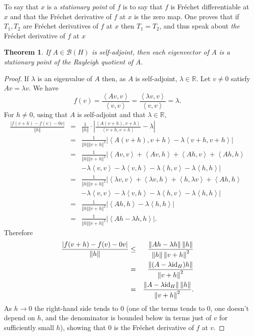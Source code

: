 \documentclass{article}
\newcommand{\inner}[2]{\left\langle #1, #2 \right\rangle}
\newcommand{\id}{\ensuremath\mathrm{id}}
\newcommand{\norm}[1]{\left\Vert #1 \right\Vert}
\newtheorem{theorem}{Theorem}
\theoremstyle{definition}
\begin{document}
To say that $x$ is a {\em stationary point} of $f$ is to say that
$f$ is Fr\'echet differentiable at $x$ and that the Fr\'echet derivative of $f$ at $x$ is the zero map. One proves that
if $T_1,T_2$ are Fr\'echet derivatives of $f$ at $x$ then $T_1=T_2$, and thus speak about {\em the} Fr\'echet derivative
of $f$ at $x$

\begin{theorem}
If $A \in \mathscr{B}(H)$ is self-adjoint, then each eigenvector of $A$ is a stationary point
of the Rayleigh quotient of $A$.
\end{theorem}
\begin{proof}
If $\lambda$ is an eigenvalue of $A$ then, as $A$ is self-adjoint, $\lambda \in \mathbb{R}$. Let $v \neq 0$ satisfy
$Av=\lambda v$. We have
\[
f(v)=\frac{\inner{Av}{v}}{\inner{v}{v}}= \frac{\inner{\lambda v}{v}}{\inner{v}{v}}=\lambda.
\]
For $h \neq 0$, using that $A$ is self-adjoint and that $\lambda \in \mathbb{R}$,
\begin{eqnarray*}
\frac{|f(v+h)-f(v)-0v|}{\norm{h}}&=&\frac{1}{\norm{h}} \cdot \left| \frac{\inner{A(v+h)}{v+h}}{\inner{v+h}{v+h}} - \lambda \right|\\
&=&\frac{1}{\norm{h} \norm{v+h}^2} \left| \inner{A(v+h)}{v+h} - \lambda \inner{v+h}{v+h} \right|\\
&=&\frac{1}{\norm{h} \norm{v+h}^2} \big| \inner{Av}{v}+\inner{Av}{h}+\inner{Ah}{v}+\inner{Ah}{h}\\
&&-\lambda \inner{v}{v} - \lambda \inner{v}{h}-\lambda \inner{h}{v} - \lambda \inner{h}{h}  \big|\\
&=&\frac{1}{\norm{h} \norm{v+h}^2} \big| \inner{\lambda v}{v}+\inner{\lambda v}{h}+\inner{ h}{\lambda v}+\inner{A h}{h}\\
&&-\lambda \inner{v}{v} - \lambda \inner{v}{h}-\lambda \inner{h}{v} - \lambda \inner{h}{h}  \big|\\
&=&\frac{1}{\norm{h} \norm{v+h}^2} \left| \inner{A h}{h} - \lambda \inner{h}{h} \right|\\
&=&\frac{1}{\norm{h} \norm{v+h}^2} |\inner{Ah-\lambda h}{h}|.
\end{eqnarray*}
Therefore 
\begin{eqnarray*}
\frac{|f(v+h)-f(v)-0v|}{\norm{h}}&\leq&\frac{\norm{Ah-\lambda h} \norm{h}}{\norm{h} \norm{v+h}^2}\\
&=&\frac{\norm{(A-\lambda \id_H)h}}{\norm{v+h}^2}\\
&=&\frac{\norm{A-\lambda \id_H} \norm{h}}{\norm{v+h}^2}.
\end{eqnarray*}
As $h \to 0$ the right-hand side tends to $0$ (one of the terms tends to $0$, one doesn't depend on $h$, and the denominator
is bounded below in terms just of $v$ for sufficiently small $h$), showing that $0$ is the Fr\'echet derivative of $f$ at $v$.
\end{proof}
\end{document}
